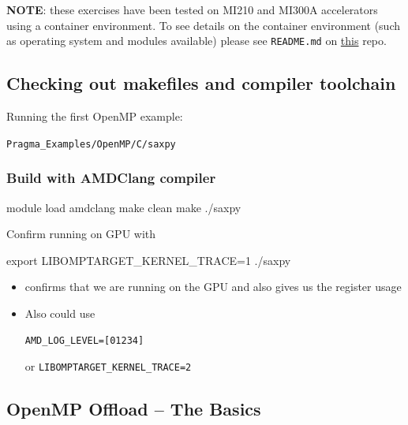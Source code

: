 \documentclass[
]{article}
\providecommand{\tightlist}{%
  \setlength{\itemsep}{0pt}\setlength{\parskip}{0pt}}
\let\oldtexttt\texttt
\renewcommand{\texttt}[1]{
  \colorbox{Light}{\oldtexttt{#1}}
}
\newenvironment{Shaded}{}{}
\newcommand{\BuiltInTok}[1]{#1}
\newcommand{\ExtensionTok}[1]{#1}
\newcommand{\FunctionTok}[1]{\textcolor[rgb]{0.02,0.16,0.49}{#1}}
\newcommand{\NormalTok}[1]{#1}
\newcommand{\VariableTok}[1]{\textcolor[rgb]{0.10,0.09,0.49}{#1}}
\providecommand{\tightlist}{%
  \setlength{\itemsep}{0pt}\setlength{\parskip}{0pt}}
\begin{document}
\textbf{NOTE}: these exercises have been tested on MI210 and MI300A
accelerators using a container environment. To see details on the
container environment (such as operating system and modules available)
please see \texttt{README.md} on
\href{https://github.com/amd/HPCTrainingDock}{this} repo.

\hypertarget{checking-out-makefiles-and-compiler-toolchain}{%
\subsection{Checking out makefiles and compiler
toolchain}\label{checking-out-makefiles-and-compiler-toolchain}}

Running the first OpenMP example:
\texttt{Pragma\_Examples/OpenMP/C/saxpy}

\hypertarget{build-with-amdclang-compiler}{%
\subsubsection{Build with AMDClang
compiler}\label{build-with-amdclang-compiler}}

\begin{Shaded}
\begin{Highlighting}[]
\ExtensionTok{module}\NormalTok{ load amdclang}
\FunctionTok{make}\NormalTok{ clean }
\FunctionTok{make} 
\ExtensionTok{./saxpy} 
\end{Highlighting}
\end{Shaded}

Confirm running on GPU with

\begin{Shaded}
\begin{Highlighting}[]
\BuiltInTok{export} \VariableTok{LIBOMPTARGET\_KERNEL\_TRACE=}\NormalTok{1 }
\ExtensionTok{./saxpy}
\end{Highlighting}
\end{Shaded}

\begin{itemize}
\tightlist
\item
  confirms that we are running on the GPU and also gives us the register
  usage
\item
  Also could use
  \texttt{AMD\_LOG\_LEVEL={[}0\textbar{}1\textbar{}2\textbar{}3\textbar{}4{]}}
  or \texttt{LIBOMPTARGET\_KERNEL\_TRACE=2}
\end{itemize}

\hypertarget{openmp-offload-the-basics}{%
\subsection{OpenMP Offload -- The
Basics}\label{openmp-offload-the-basics}}
\end{document}
